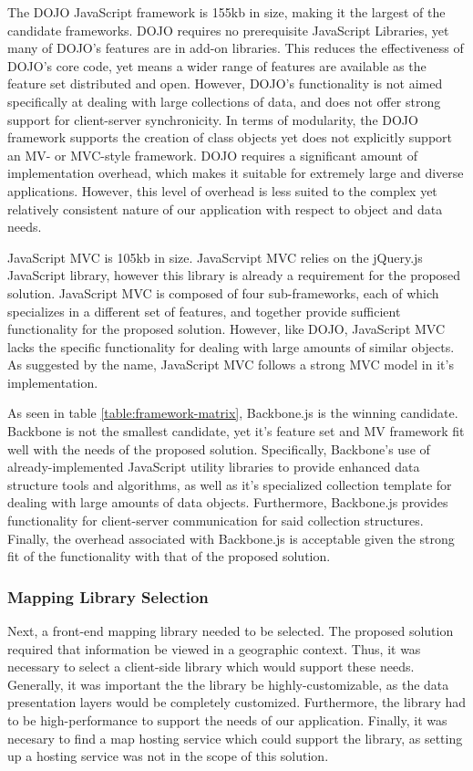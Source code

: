 \documentclass{report}
\begin{document}
The DOJO JavaScript framework is 155kb in size, making it the largest of the candidate frameworks. DOJO requires no prerequisite JavaScript Libraries, yet many of DOJO's features are in add-on libraries. This reduces the effectiveness of DOJO's core code, yet means a wider range of features are available as the feature set distributed and open. However, DOJO's functionality is not aimed specifically at dealing with large collections of data, and does not offer strong support for client-server synchronicity. In terms of modularity, the DOJO framework supports the creation of class objects yet does not explicitly support an MV- or MVC-style framework. DOJO requires a significant amount of implementation overhead, which makes it suitable for extremely large and diverse applications. However, this level of overhead is less suited to the complex yet relatively consistent nature of our application with respect to object and data needs.

JavaScript MVC is 105kb in size. JavaScrvipt MVC relies on the jQuery.js JavaScript library, however this library is already a requirement for the proposed solution. JavaScript MVC is composed of four sub-frameworks, each of which specializes in a different set of features, and together provide sufficient functionality for the proposed solution. However, like DOJO, JavaScript MVC lacks the specific functionality for dealing with large amounts of similar objects. As suggested by the name, JavaScript MVC follows a strong MVC model in it's implementation.

As seen in table \ref{table:framework-matrix}, Backbone.js is the winning candidate. Backbone is not the smallest candidate, yet it's feature set and MV framework fit well with the needs of the proposed solution. Specifically, Backbone's use of already-implemented JavaScript utility libraries to provide enhanced data structure tools and algorithms, as well as it's specialized collection template for dealing with large amounts of data objects. Furthermore, Backbone.js provides functionality for client-server communication for said collection structures. Finally, the overhead associated with Backbone.js is acceptable given the strong fit of the functionality with that of the proposed solution.

\subsubsection{Mapping Library Selection}

Next, a front-end mapping library needed to be selected. The proposed solution required that information be viewed in a geographic context. Thus, it was necessary to select a client-side library which would support these needs. Generally, it was important the the library be highly-customizable, as the data presentation layers would be completely customized. Furthermore, the library had to be high-performance to support the needs of our application. Finally, it was necesary to find a map hosting service which could support the library, as setting up a hosting service was not in the scope of this solution.
\end{document}
